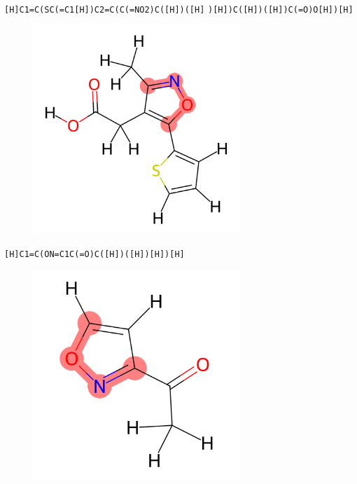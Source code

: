 \documentclass{beamer}
\begin{document}
\begin{frame}[fragile]
\verb|[H]C1=C(SC(=C1[H])C2=C(C(=NO2)C([H])([H]|
\verb|)[H])C([H])([H])C(=O)O[H])[H]|

\begin{figure}
    \includegraphics[width=0.7\textwidth,height=0.7\textheight,keepaspectratio]{mol02.png}
\end{figure}
\end{frame}
\begin{frame}[fragile]
\verb|[H]C1=C(ON=C1C(=O)C([H])([H])[H])[H]|

\begin{figure}
    \includegraphics[width=0.7\textwidth,height=0.7\textheight,keepaspectratio]{mol03.png}
\end{figure}
\end{frame}
\end{document}

